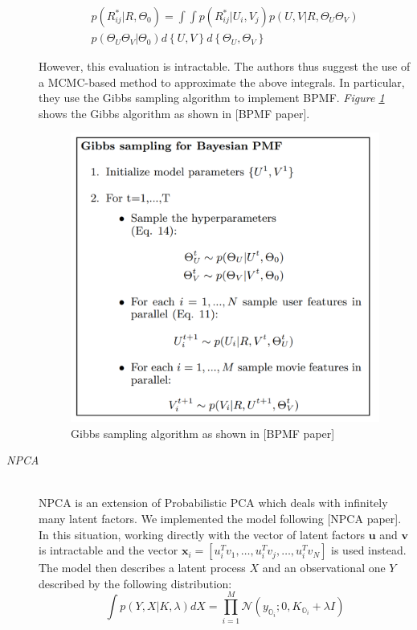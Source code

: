 \documentclass[10pt,conference,compsocconf]{IEEEtran}
\begin{document}
\begin{description}
$$
\begin{aligned}
p(R_{ij}^* \vert R, \Theta_0) =  \int\int p(R_{ij}^* \vert U_i,V_j)p(U,V \vert R, \Theta_U \Theta_V) \\
p(\Theta_U \Theta_V \vert \Theta_0)d \left\lbrace U,V \right\rbrace  d \left\lbrace \Theta_U, \Theta_V \right\rbrace
\end{aligned}
$$

\noindent However, this evaluation is intractable. The authors thus suggest the use of a MCMC-based method to approximate the above integrals. In particular, they use the Gibbs sampling algorithm to implement BPMF. \emph{Figure \ref{gibbs}} shows the Gibbs algorithm as shown in [BPMF paper].

\begin{figure}[h!]
\centering
\includegraphics[scale=0.35]{gibbs.png}
\caption{Gibbs sampling algorithm as shown in [BPMF paper]}
\label{gibbs}
\end{figure} 

\item[\emph{NPCA}] \ \\
NPCA is an extension of Probabilistic PCA which deals with infinitely many latent factors. We implemented the model following [NPCA paper]. In this situation, working directly with the vector of latent factors $\textbf{u}$ and $\textbf{v}$ is intractable and the vector $\textbf{x}_i = \left[u_i^Tv_1, \dots , u_i^Tv_j, \dots , u_i^Tv_N \right] $ is used instead. The model then describes a latent process $X$ and an observational one $Y$ described by the following distribution:
$$
\int p(Y,X \vert K, \lambda)dX = \prod_{i=1}^M \mathcal{N}(y_{\mathbb{O}_i};0, K_{\mathbb{O}_i} + \lambda I)
$$


\end{description}
\end{document}
